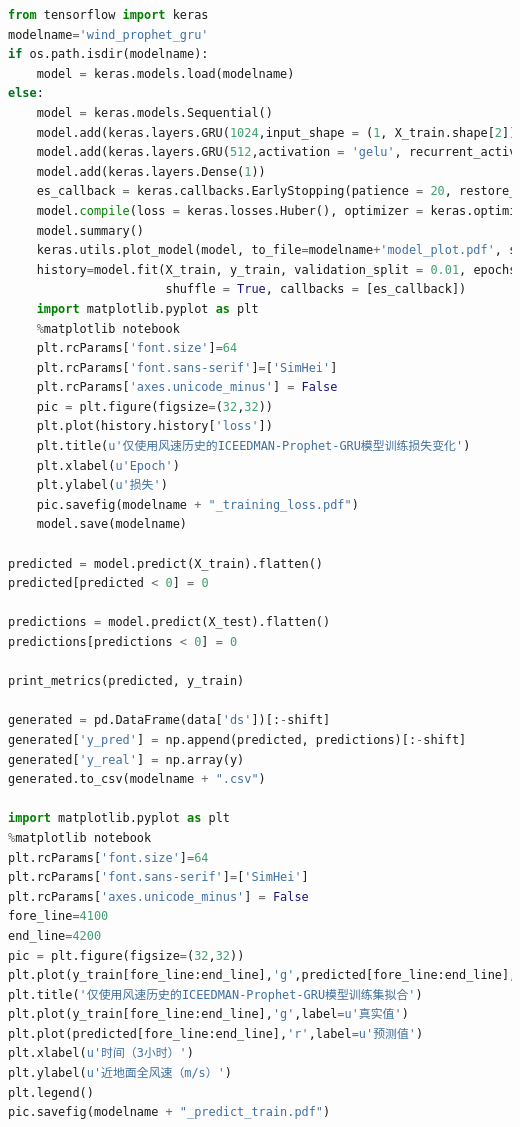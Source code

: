 \documentclass[AutoFakeBold]{LZUThesis}
\begin{document}
\begin{lstlisting}[language = python]
from tensorflow import keras
modelname='wind_prophet_gru'
if os.path.isdir(modelname):
    model = keras.models.load(modelname)
else:
    model = keras.models.Sequential()
    model.add(keras.layers.GRU(1024,input_shape = (1, X_train.shape[2]),return_sequences = True))
    model.add(keras.layers.GRU(512,activation = 'gelu', recurrent_activation = 'gelu',return_sequences = True))
    model.add(keras.layers.Dense(1))
    es_callback = keras.callbacks.EarlyStopping(patience = 20, restore_best_weights = True, monitor="loss")
    model.compile(loss = keras.losses.Huber(), optimizer = keras.optimizers.Nadam(0.001))
    model.summary()
    keras.utils.plot_model(model, to_file=modelname+'model_plot.pdf', show_shapes=True, show_layer_names=True)
    history=model.fit(X_train, y_train, validation_split = 0.01, epochs = 100, verbose = 1,
                      shuffle = True, callbacks = [es_callback])
    import matplotlib.pyplot as plt
    %matplotlib notebook
    plt.rcParams['font.size']=64
    plt.rcParams['font.sans-serif']=['SimHei']
    plt.rcParams['axes.unicode_minus'] = False
    pic = plt.figure(figsize=(32,32))
    plt.plot(history.history['loss'])
    plt.title(u'仅使用风速历史的ICEEDMAN-Prophet-GRU模型训练损失变化')
    plt.xlabel(u'Epoch')
    plt.ylabel(u'损失')
    pic.savefig(modelname + "_training_loss.pdf")
    model.save(modelname)

predicted = model.predict(X_train).flatten()
predicted[predicted < 0] = 0

predictions = model.predict(X_test).flatten()
predictions[predictions < 0] = 0

print_metrics(predicted, y_train)

generated = pd.DataFrame(data['ds'])[:-shift]
generated['y_pred'] = np.append(predicted, predictions)[:-shift]
generated['y_real'] = np.array(y)
generated.to_csv(modelname + ".csv")

import matplotlib.pyplot as plt
%matplotlib notebook
plt.rcParams['font.size']=64
plt.rcParams['font.sans-serif']=['SimHei']
plt.rcParams['axes.unicode_minus'] = False
fore_line=4100
end_line=4200
pic = plt.figure(figsize=(32,32))
plt.plot(y_train[fore_line:end_line],'g',predicted[fore_line:end_line],'r')
plt.title('仅使用风速历史的ICEEDMAN-Prophet-GRU模型训练集拟合')
plt.plot(y_train[fore_line:end_line],'g',label=u'真实值')
plt.plot(predicted[fore_line:end_line],'r',label=u'预测值')
plt.xlabel(u'时间（3小时）')
plt.ylabel(u'近地面全风速（m/s）')
plt.legend()
pic.savefig(modelname + "_predict_train.pdf")
\end{lstlisting}
\end{document}
